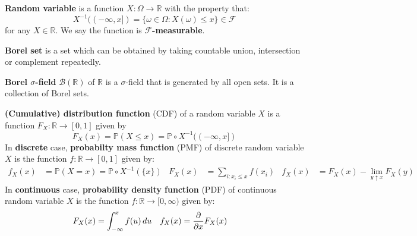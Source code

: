 \documentclass{huhtakm-template-book}
\newcommand{\prob}{\mathbb{P}}
\begin{document}
    \begin{sdefn}
        \textbf{Random variable} is a function $X:\Omega\to\mathbb{R}$ with the property that:
        \begin{equation*}
            X^{-1}((-\infty,x])=\{\omega\in\Omega:X(\omega)\leq x\}\in\mathcal{F}
        \end{equation*}
        for any $X\in\mathbb{R}$. We say the function is \textbf{$\mathcal{F}$-measurable}.
    \end{sdefn}
    \begin{sdefn}
        \textbf{Borel set} is a set which can be obtained by taking countable union, intersection or complement repeatedly.
    \end{sdefn}
    \begin{sdefn}
        \textbf{Borel $\sigma$-field} $\mathcal{B}(\mathbb{R})$ of $\mathbb{R}$ is a $\sigma$-field that is generated by all open sets. It is a collection of Borel sets.
    \end{sdefn}
    \begin{sdefn}
        \textbf{(Cumulative) distribution function} (CDF) of a random variable $X$ is a function $F_{X}:\mathbb{R}\to[0,1]$ given by
        \begin{equation*}
            F_{X}(x)=\prob(X\leq x)=\prob\circ X^{-1}((-\infty,x])
        \end{equation*}
        In \textbf{discrete} case, \textbf{probabilty mass function} (PMF) of discrete random variable $X$ is the function $f:\mathbb{R}\to[0,1]$ given by:
        \begin{align*}
            f_{X}(x)&=\prob(X=x)=\prob\circ X^{-1}(\{x\}) & F_{X}(x)&=\sum_{i:x_{i}\leq x}f(x_{i}) & f_{X}(x)&=F_{X}(x)-\lim_{y\uparrow x}F_{X}(y)
        \end{align*}
        In \textbf{continuous} case, \textbf{probability density function} (PDF) of continuous random variable $X$ is the function $f:\mathbb{R}\to[0,\infty)$ given by:
        \begin{align*}
            F_{X}(x)&=\int_{-\infty}^{x}f(u)\,du & f_{X}(x)&=\pdv*{F_{X}(x)}{x}
        \end{align*}
    \end{sdefn}
    
\end{document}
